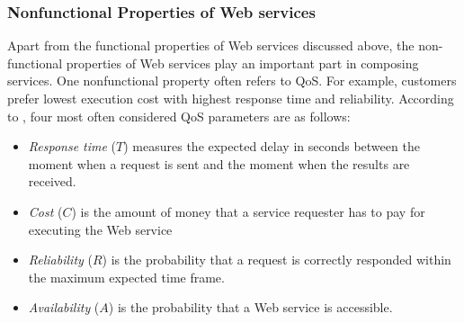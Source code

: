 
\subsubsection{Nonfunctional Properties of Web services}\label{nonfunctional}
Apart from the functional properties of Web services discussed above, the non-functional properties of Web services play an important part in composing services. One nonfunctional property often refers to QoS. For example, customers prefer lowest execution cost with highest response time and reliability. According to \cite{zeng2003quality}, four most often considered QoS parameters are as follows:
\begin{itemize}
\item \textit{Response time} ($T$) measures the expected delay in seconds between the moment when a request is sent and the moment when the results are received.
\item \textit{Cost} ($C$) is the amount of money that a service requester has to pay for executing the Web service
\item \textit{Reliability} ($R$) is the probability that a request is correctly responded within the maximum expected time frame.
\item \textit{Availability} ($A$) is the probability that a Web service is accessible.
\end{itemize}

